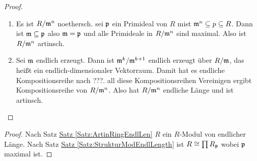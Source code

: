 \begin{proof}
    \begin{enumerate}
        \item Es ist \(R/\mathfrak{m}^n\) noethersch. sei \(\mathfrak{p}\) ein Primideal von \(R\) mist \(\mathfrak{m}^n\subseteq p\subseteq R\).
        Dann ist \(\mathfrak{m}\subseteq \mathfrak{p}\) also \(\mathfrak{m}=\mathfrak{p}\) und alle Primideale in \(R/\mathfrak{m}^n\) sind maximal. Also ist \(R/\mathfrak{m}^n\) artinsch.
        \item Sei \(\mathfrak{m}\) endlich erzeugt. Dann ist \(\mathfrak{m}^k/\mathfrak{m}^{k+1}\) endlich erzeugt über \(R/\mathfrak{m}\), das heißt ein endlich-dimensionaler Vektorraum. Damit hat es endliche Kompositionsreihe nach ???.
        all diese Kompositionsreihen Vereinigen ergibt Kompositionsreihe von \(R/\mathfrak{m}^n\). Also hat \(R/\mathfrak{m}^n\) endliche Länge und ist artinsch.
    \end{enumerate}
\end{proof}

\begin{proof}
    Nach Satz \hyperref[Satz:ArtinRingEndlLen]{Satz \ref{Satz:ArtinRingEndlLen}} \(R\) ein \(R\)-Modul von endlicher Länge. Nach Satz \hyperref[Satz:StrukturModEndlLength]{Satz \ref{Satz:StrukturModEndlLength}} ist \(R\cong \prod R_{\mathfrak{p}}\) wobei \(\mathfrak{p}\) maximal ist.
\end{proof}


